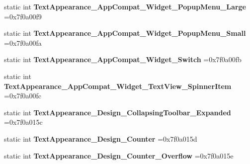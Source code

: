 \begin{DoxyCompactItemize}
static int {\bfseries Text\+Appearance\+\_\+\+App\+Compat\+\_\+\+Widget\+\_\+\+Popup\+Menu\+\_\+\+Large} =0x7f0a00f9
\item 
\mbox{\label{classandroid_1_1support_1_1graphics_1_1drawable_1_1animated_1_1R_1_1style_a7727de70eb66ffeb3a75622e8cfbe0e4}} 
static int {\bfseries Text\+Appearance\+\_\+\+App\+Compat\+\_\+\+Widget\+\_\+\+Popup\+Menu\+\_\+\+Small} =0x7f0a00fa
\item 
\mbox{\label{classandroid_1_1support_1_1graphics_1_1drawable_1_1animated_1_1R_1_1style_a257aa44a93bb014b426bdb32aa8261fa}} 
static int {\bfseries Text\+Appearance\+\_\+\+App\+Compat\+\_\+\+Widget\+\_\+\+Switch} =0x7f0a00fb
\item 
\mbox{\label{classandroid_1_1support_1_1graphics_1_1drawable_1_1animated_1_1R_1_1style_a18c8f759b2e4286235bfbac026b4da95}} 
static int {\bfseries Text\+Appearance\+\_\+\+App\+Compat\+\_\+\+Widget\+\_\+\+Text\+View\+\_\+\+Spinner\+Item} =0x7f0a00fc
\item 
\mbox{\label{classandroid_1_1support_1_1graphics_1_1drawable_1_1animated_1_1R_1_1style_afd12efed8c85c103cf42f57c51f10205}} 
static int {\bfseries Text\+Appearance\+\_\+\+Design\+\_\+\+Collapsing\+Toolbar\+\_\+\+Expanded} =0x7f0a015c
\item 
\mbox{\label{classandroid_1_1support_1_1graphics_1_1drawable_1_1animated_1_1R_1_1style_a40b0e8d5a462bb52a8ee1879814fb39e}} 
static int {\bfseries Text\+Appearance\+\_\+\+Design\+\_\+\+Counter} =0x7f0a015d
\item 
\mbox{\label{classandroid_1_1support_1_1graphics_1_1drawable_1_1animated_1_1R_1_1style_a81eaa887a847fe3ce363729a6a7dd778}} 
static int {\bfseries Text\+Appearance\+\_\+\+Design\+\_\+\+Counter\+\_\+\+Overflow} =0x7f0a015e
\item 
\mbox{\label{classandroid_1_1support_1_1graphics_1_1drawable_1_1animated_1_1R_1_1style_a4edbeda8562bc05a274ff9efc4034979}} 

\end{DoxyCompactItemize}
